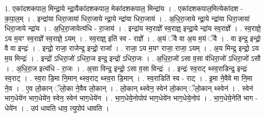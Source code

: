 \documentclass[17pt]{extarticle}
\begin{document}
1. एका॑दशकपाल॒ मिन्द्रा॒ये न्द्रा॒यैका॑दशकपाल॒ मेका॑दशकपाल॒ मिन्द्रा॑य । . एका॑दशकपाल॒मित्येका॑दश - क॒पा॒ल॒म् । . इन्द्रा॑या धिरा॒जाया॑ धिरा॒जाये न्द्रा॒ये न्द्रा॑या धिरा॒जाय॑ । . अ॒धि॒रा॒जाये न्द्रा॒ये न्द्रा॑या धिरा॒जाया॑ धिरा॒जाये न्द्रा॑य । . अ॒धि॒रा॒जायेत्य॑धि - रा॒जाय॑ । . इन्द्रा॑य स्व॒राज्ञे᳚ स्व॒राज्ञ्॒ इन्द्रा॒ये न्द्रा॑य स्व॒राज्ञे᳚ । . स्व॒राज्ञे॒ ऽय म॒यꣳ स्व॒राज्ञे᳚ स्व॒राज्ञे॒ ऽयम् । . स्व॒राज्ञ्॒ इति॑ स्व - राज्ञे᳚ । . अ॒यं ॅवै वा अ॒य म॒यं ॅवै । . वा इन्द्र॒ इन्द्रो॒ वै वा इन्द्रः॑ । . इन्द्रो॒ राजा॒ राजेन्द्र॒ इन्द्रो॒ राजा᳚ । . राजा॒ ऽय म॒यꣳ राजा॒ राजा॒ ऽयम् । . अ॒य मिन्द्र॒ इन्द्रो॒ ऽय म॒य मिन्द्रः॑ । . इन्द्रो॑ ऽधिरा॒जो॑ ऽधिरा॒ज इन्द्र॒ इन्द्रो॑ ऽधिरा॒जः । . अ॒धि॒रा॒जो॑ ऽसा व॒सा व॑धिरा॒जो॑ ऽधिरा॒जो॑ ऽसौ । . अ॒धि॒रा॒ज इत्य॑धि - रा॒जः । . अ॒सा विन्द्र॒ इन्द्रो॒ ऽसा व॒सा विन्द्रः॑ । . इन्द्रः॑ स्व॒राट् थ्स्व॒राडिन्द्र॒ इन्द्रः॑ स्व॒राट् । . स्व॒रा डि॒मा नि॒मान् थ्स्व॒राट् थ्स्व॒रा डि॒मान् । . स्व॒राडिति॑ स्व - राट् । . इ॒मा ने॒वैवे मा नि॒मा ने॒व । . ए॒व लो॒कान् ॅलो॒का ने॒वैव लो॒कान् । . लो॒कान् थ्स्वेन॒ स्वेन॑ लो॒कान् ॅलो॒कान् थ्स्वेन॑ । . स्वेन॑ भाग॒धेये॑न भाग॒धेये॑न॒ स्वेन॒ स्वेन॑ भाग॒धेये॑न । . भा॒ग॒धेये॒नोपोप॑ भाग॒धेये॑न भाग॒धेये॒नोप॑ । . भा॒ग॒धेये॒नेति॑ भाग - धेये॑न । . उप॑ धावति धाव॒ त्युपोप॑ धावति । \newline
\end{document}
